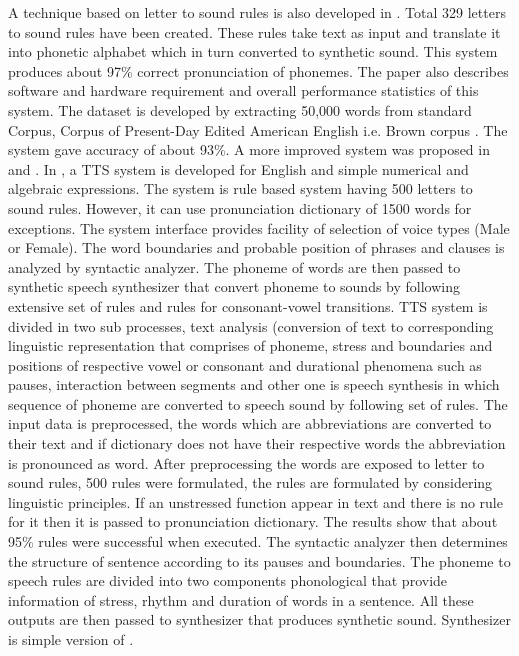 A technique based on letter to sound rules is also developed in \cite{elovitz1976automatic}. Total 329 letters to sound rules have
been created. These rules take text as input and translate it into phonetic alphabet which in turn converted to synthetic sound.
This system produces about 97\% correct pronunciation of phonemes. The paper also describes software and hardware
requirement and overall performance statistics of this system. The dataset is developed by extracting
50,000 words from standard Corpus, Corpus of Present-Day Edited American English i.e. Brown
corpus \cite{ku1967computational}. The system gave accuracy of about 93\%. A more
improved system was proposed in \cite{carlson1982multi} and \cite{klatt1982klattalk}. 
In \cite{klatt1982klattalk}, a TTS system is developed for English and simple numerical and algebraic expressions. 
The system is rule based system having 500 letters to sound rules. However, it can use pronunciation dictionary of 1500 words for exceptions. 
The system interface provides facility of selection of voice types (Male or Female). The word boundaries and probable
position of phrases and clauses is analyzed by syntactic analyzer. The phoneme of words are then passed to synthetic speech
synthesizer that convert phoneme to sounds by following extensive set of rules and rules for consonant-vowel transitions. 
TTS system is divided in two sub processes, text analysis (conversion of text to
corresponding linguistic representation that comprises of phoneme, stress and boundaries and positions of respective vowel
or consonant and durational phenomena such as pauses, interaction between segments \cite{klatt1979synthesis} and other one is
speech synthesis in which sequence of phoneme are converted to speech sound by following set of rules. The input data is
preprocessed, the words which are abbreviations are converted to their text and if dictionary does not have their respective
words the abbreviation is pronounced as word. After preprocessing the words are exposed to letter to sound rules, 500 rules
were formulated, the rules are formulated by considering linguistic principles. If an unstressed function appear in text and
there is no rule for it then it is passed to pronunciation dictionary. The results show that about 95\% rules were successful
when executed. The syntactic analyzer then determines the structure of sentence according to its pauses and boundaries. The phoneme to speech rules
are divided into two components phonological that provide information of stress, rhythm and duration of words in a sentence.
All these outputs are then passed to synthesizer that produces synthetic sound. Synthesizer is simple version of \cite{klatt1980software}.


